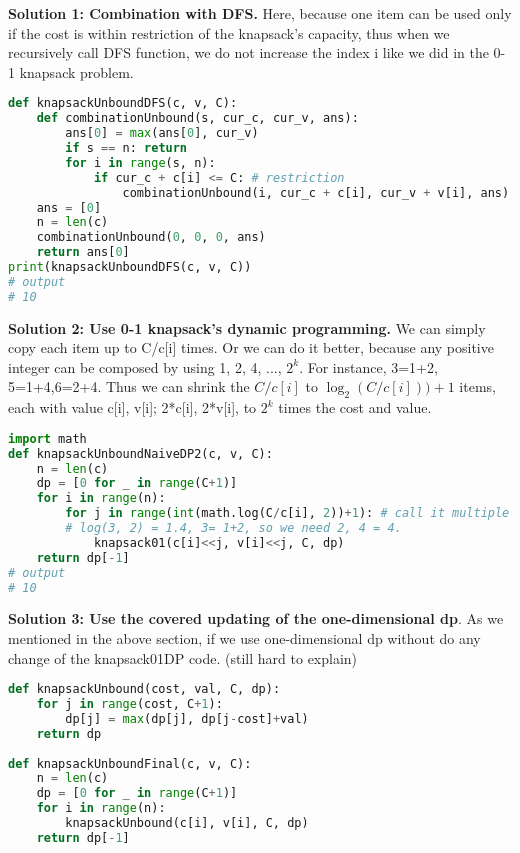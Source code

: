 \documentclass[../main.tex]{subfiles}
\begin{document}
\textbf{Solution 1: Combination with DFS.} Here, because one item can be used only if the cost is within restriction of the knapsack's capacity, thus when we recursively call DFS function, we do not increase the index i like we did in the 0-1 knapsack problem. 
\begin{lstlisting}[language=Python]
def knapsackUnboundDFS(c, v, C):
    def combinationUnbound(s, cur_c, cur_v, ans):
        ans[0] = max(ans[0], cur_v)
        if s == n: return
        for i in range(s, n):
            if cur_c + c[i] <= C: # restriction
                combinationUnbound(i, cur_c + c[i], cur_v + v[i], ans)
    ans = [0]
    n = len(c)
    combinationUnbound(0, 0, 0, ans)
    return ans[0]
print(knapsackUnboundDFS(c, v, C))
# output
# 10
\end{lstlisting}
\textbf{Solution 2: Use 0-1 knapsack's dynamic programming. } We can simply copy each item up to C/c[i] times. Or we can do it better, because any positive integer can be composed by using 1, 2, 4, ..., $2^{k}$. For instance, 3=1+2, 5=1+4,6=2+4. Thus we can shrink the $C/c[i]$ to $\log_2(C/c[i]))+1$ items, each with value c[i], v[i]; 2*c[i], 2*v[i], to $2^k$ times the cost and value. 
\begin{lstlisting}[language=Python]
import math    
def knapsackUnboundNaiveDP2(c, v, C):
    n = len(c)
    dp = [0 for _ in range(C+1)] 
    for i in range(n):
        for j in range(int(math.log(C/c[i], 2))+1): # call it multiple times
        # log(3, 2) = 1.4, 3= 1+2, so we need 2, 4 = 4. 
            knapsack01(c[i]<<j, v[i]<<j, C, dp)
    return dp[-1]
# output
# 10
\end{lstlisting}
\textbf{Solution 3: Use the covered updating of the one-dimensional dp}. As we mentioned in the above section, if we use one-dimensional dp without do any change of the knapsack01DP code. (still hard to explain)
\begin{lstlisting}[language=Python]
def knapsackUnbound(cost, val, C, dp):
    for j in range(cost, C+1):
        dp[j] = max(dp[j], dp[j-cost]+val)
    return dp
    
def knapsackUnboundFinal(c, v, C):
    n = len(c)
    dp = [0 for _ in range(C+1)] 
    for i in range(n):
        knapsackUnbound(c[i], v[i], C, dp)
    return dp[-1]
\end{lstlisting}

\end{document}
